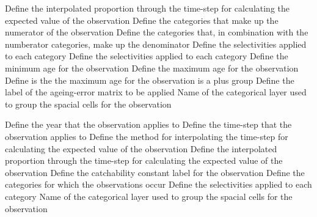  {Define the interpolated proportion through the time-step for calculating the expected value of the observation}
 {Define the categories that make up the numerator of the observation}
 {Define the categories that, in combination with the numberator categories, make up the denominator}
 {Define the selectivities applied to each category}
 {Define the selectivities applied to each category}
 {Define the minimum age for the observation}
 {Define the maximum age for the observation}
 {Define is the the maximum age for the observation is a plus group}
 {Define the label of the ageing-error matrix to be applied}
 {Name of the categorical layer used to group the spacial cells for the observation}
\par\textbf{}\par
{} {Define the year that the observation applies to}
 {Define the time-step that the observation applies to}
 {Define the method for interpolating the time-step for calculating the expected value of the observation}
 {Define the interpolated proportion through the time-step for calculating the expected value of the observation}
 {Define the catchability constant label for the observation}
 {Define the categories for which the observations occur}
 {Define the selectivities applied to each category}
 {Name of the categorical layer used to group the spacial cells for the observation}
